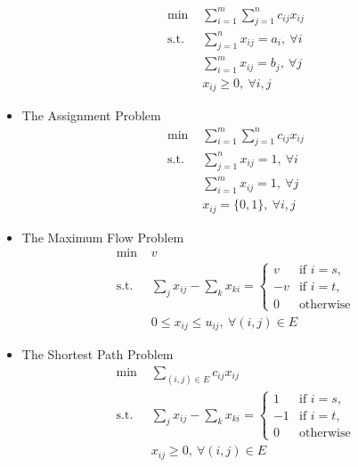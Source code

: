 \documentclass[10pt, twocolumn]{article}
\begin{document}
\begin{itemize}
\[\begin{array}{cl}
\text{min } & \sum_{i=1}^m\sum_{j=1}^nc_{ij}x_{ij} \\
\text{s.t.} & \sum_{j=1}^nx_{ij} = a_i,\ \forall i \\
& \sum_{i=1}^mx_{ij}=b_j,\ \forall j \\
& x_{ij} \geq 0,\ \forall i,j
\end{array} \]
\item The Assignment Problem
\[ \begin{array}{cl}
\text{min } & \sum_{i=1}^m\sum_{j=1}^nc_{ij}x_{ij} \\
\text{s.t.} & \sum_{j=1}^nx_{ij} = 1,\ \forall i \\
& \sum_{i=1}^mx_{ij} = 1,\ \forall j \\
& x_{ij} = \{0,1\},\ \forall i,j
\end{array} \]
\item The Maximum Flow Problem
\[ \begin{array}{cl}
\text{min } & v \\
\text{s.t.} & \sum_jx_{ij}-\sum_kx_{ki} = \left\{ \begin{array}{ll}
  v & \text{if } i=s, \\
  -v & \text{if } i=t, \\
  0 & \text{otherwise} \end{array}\right. \\
& 0 \leq x_{ij} \leq u_{ij},\ \forall (i,j) \in E
\end{array} \]
\item The Shortest Path Problem
\[ \begin{array}{cl}
\text{min } & \sum_{(i,j) \in E}c_{ij}x_{ij} \\
\text{s.t.} & \sum_jx_{ij}-\sum_kx_{ki} = \left\{ \begin{array}{ll}
  1 & \text{if } i=s, \\
  -1 & \text{if } i=t, \\
  0 & \text{otherwise} \end{array}\right. \\
& x_{ij} \geq 0,\ \forall (i,j) \in E
\end{array} \]
\end{itemize}
\end{document}
